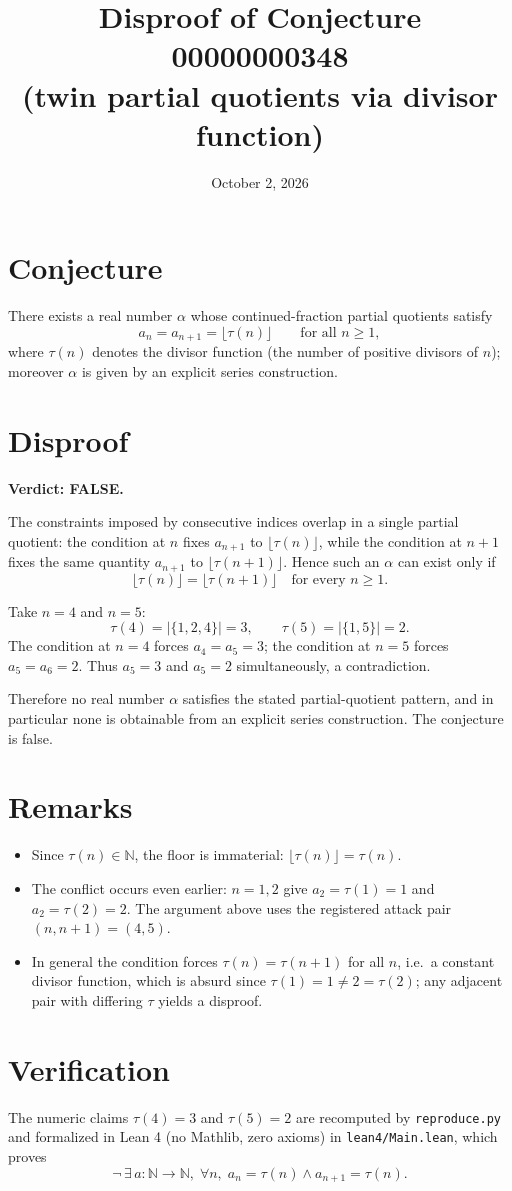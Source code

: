 \documentclass[11pt]{article}
\title{Disproof of Conjecture 00000000348\\ \large (twin partial quotients via divisor function)}
\date{October 2, 2026}
\begin{document}
\maketitle

\section{Conjecture}
There exists a real number $\alpha$ whose continued-fraction partial quotients satisfy
\[
  a_n = a_{n+1} = \lfloor \tau(n) \rfloor \qquad \text{for all } n \ge 1,
\]
where $\tau(n)$ denotes the divisor function (the number of positive divisors of $n$);
moreover $\alpha$ is given by an explicit series construction.

\section{Disproof}
\textbf{Verdict: FALSE.}

The constraints imposed by consecutive indices overlap in a single partial quotient:
the condition at $n$ fixes $a_{n+1}$ to $\lfloor\tau(n)\rfloor$, while the condition at
$n+1$ fixes the same quantity $a_{n+1}$ to $\lfloor\tau(n+1)\rfloor$. Hence such an
$\alpha$ can exist only if
\[
  \lfloor\tau(n)\rfloor = \lfloor\tau(n+1)\rfloor \quad\text{for every } n \ge 1 .
\]

Take $n = 4$ and $n = 5$:
\[
  \tau(4) = \lvert\{1,2,4\}\rvert = 3, \qquad
  \tau(5) = \lvert\{1,5\}\rvert = 2 .
\]
The condition at $n=4$ forces $a_4 = a_5 = 3$; the condition at $n=5$ forces
$a_5 = a_6 = 2$. Thus $a_5 = 3$ and $a_5 = 2$ simultaneously, a contradiction.

Therefore no real number $\alpha$ satisfies the stated partial-quotient pattern, and in
particular none is obtainable from an explicit series construction. The conjecture is
false.

\section{Remarks}
\begin{itemize}
\item Since $\tau(n) \in \mathbb{N}$, the floor is immaterial:
      $\lfloor\tau(n)\rfloor = \tau(n)$.
\item The conflict occurs even earlier: $n = 1,2$ give
      $a_2 = \tau(1) = 1$ and $a_2 = \tau(2) = 2$. The argument above uses the
      registered attack pair $(n,n+1) = (4,5)$.
\item In general the condition forces $\tau(n) = \tau(n+1)$ for all $n$, i.e.\ a
      constant divisor function, which is absurd since $\tau(1) = 1 \ne 2 = \tau(2)$;
      any adjacent pair with differing $\tau$ yields a disproof.
\end{itemize}

\section{Verification}
The numeric claims $\tau(4) = 3$ and $\tau(5) = 2$ are recomputed by
\texttt{reproduce.py} and formalized in Lean 4 (no Mathlib, zero axioms) in
\texttt{lean4/Main.lean}, which proves
\[
  \neg\,\exists\, a : \mathbb{N} \to \mathbb{N},\; \forall n,\; a_n = \tau(n) \wedge a_{n+1} = \tau(n).
\]
\end{document}
